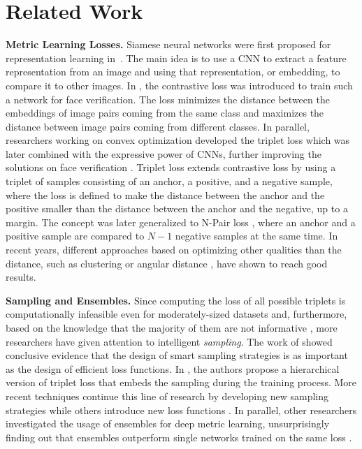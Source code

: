 \documentclass{article}
\begin{document}
 \section{Related Work}

\textbf{Metric Learning Losses.} Siamese neural networks were first proposed for representation learning in~\cite{bromley1994signature}. The main idea is to use a CNN to extract a feature representation from an image and using that representation, or embedding, to compare it to other images.
In \cite{DBLP:conf/cvpr/ChopraHL05}, the contrastive loss was introduced to train such a network for face verification. The loss minimizes the distance between the embeddings of image pairs coming from the same class and maximizes the distance between image pairs coming from different classes.
In parallel, researchers working on convex optimization developed the triplet loss \cite{DBLP:conf/nips/SchultzJ03,DBLP:journals/jmlr/WeinbergerS09} which was later combined with the expressive power of CNNs, further improving the solutions on face verification \cite{DBLP:conf/cvpr/SchroffKP15}. 
Triplet loss extends contrastive loss by using a triplet of samples consisting of an anchor, a positive, and a negative sample, where the loss is defined to make the distance between the anchor and the positive smaller than the distance between the anchor and the negative, up to a margin. 
The concept was later generalized to N-Pair loss \cite{DBLP:conf/nips/Sohn16}, where an anchor and a positive sample are compared to $N-1$ negative samples at the same time. In recent years, different approaches based on optimizing other qualities than the distance, such as clustering \cite{DBLP:conf/icml/LawUZ17,DBLP:journals/corr/abs-1110-2515} or angular distance \cite{DBLP:conf/iccv/WangZWLL17}, have shown to reach good results. 

\textbf{Sampling and Ensembles.} Since computing the loss of all possible triplets is computationally infeasible even for moderately-sized datasets and, furthermore, based on the knowledge that the majority of them are not informative \cite{DBLP:conf/cvpr/SchroffKP15}, more researchers have given attention to intelligent \textit{sampling}. 
The work of \cite{DBLP:conf/iccv/ManmathaWSK17} showed conclusive evidence that the design of smart sampling strategies is as important as the design of efficient loss functions.
In \cite{DBLP:conf/eccv/GeHDS18}, the authors propose a hierarchical version of triplet loss that embeds the sampling during the training process. More recent techniques continue this line of research by developing new sampling strategies \cite{DDBLP:conf/cvpr/Duan2019, DBLP:journals/corr/abs-2007-12749,DBLP:conf/wacv/XuanSP20} while others introduce new loss functions \cite{DDBLP:conf/cvpr/Wand2019,DDBLP:conf/cvpr/Xu2019}. 
In parallel, other researchers investigated the usage of ensembles for deep metric learning, unsurprisingly finding out that ensembles outperform single networks trained on the same loss \cite{DBLP:conf/eccv/KimGCLK18,DBLP:conf/iccv/OpitzWPB17,DDBLP:conf/cvpr/Sanakoyeu2019,DBLP:conf/eccv/XuanSP18,DBLP:conf/iccv/YuanYZ17}.
\end{document}
